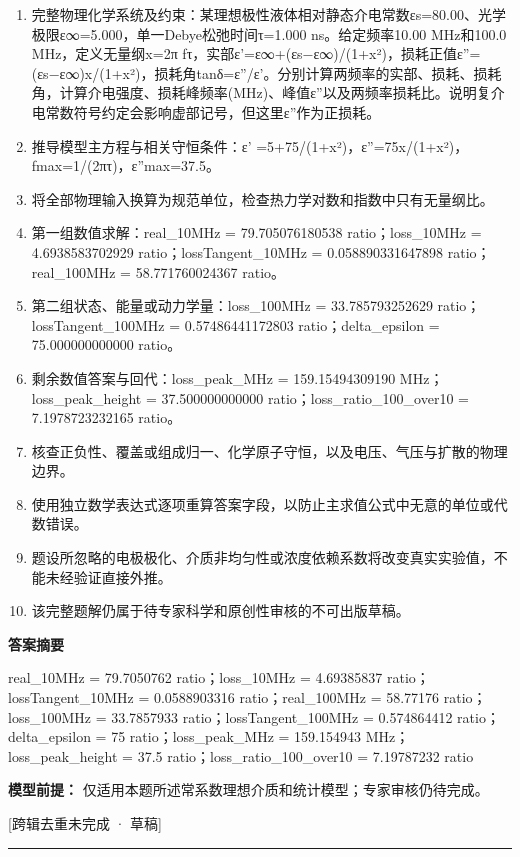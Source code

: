 \documentclass[UTF8,11pt,a4paper]{ctexart}
\begin{document}
\begin{enumerate}
\item 完整物理化学系统及约束：某理想极性液体相对静态介电常数εs=80.00、光学极限ε∞=5.000，单一Debye松弛时间τ=1.000 ns。给定频率10.00 MHz和100.0 MHz，定义无量纲x=2π fτ，实部ε'=ε∞+(εs−ε∞)/(1+x²)，损耗正值ε''=(εs−ε∞)x/(1+x²)，损耗角tanδ=ε''/ε'。分别计算两频率的实部、损耗、损耗角，计算介电强度、损耗峰频率(MHz)、峰值ε''以及两频率损耗比。说明复介电常数符号约定会影响虚部记号，但这里ε''作为正损耗。
\item 推导模型主方程与相关守恒条件：ε' =5+75/(1+x²)，ε''=75x/(1+x²)，fmax=1/(2πτ)，ε''max=37.5。
\item 将全部物理输入换算为规范单位，检查热力学对数和指数中只有无量纲比。
\item 第一组数值求解：real\_10MHz = 79.705076180538 ratio；loss\_10MHz = 4.6938583702929 ratio；lossTangent\_10MHz = 0.058890331647898 ratio；real\_100MHz = 58.771760024367 ratio。
\item 第二组状态、能量或动力学量：loss\_100MHz = 33.785793252629 ratio；lossTangent\_100MHz = 0.57486441172803 ratio；delta\_epsilon = 75.000000000000 ratio。
\item 剩余数值答案与回代：loss\_peak\_MHz = 159.15494309190 MHz；loss\_peak\_height = 37.500000000000 ratio；loss\_ratio\_100\_over10 = 7.1978723232165 ratio。
\item 核查正负性、覆盖或组成归一、化学原子守恒，以及电压、气压与扩散的物理边界。
\item 使用独立数学表达式逐项重算答案字段，以防止主求值公式中无意的单位或代数错误。
\item 题设所忽略的电极极化、介质非均匀性或浓度依赖系数将改变真实实验值，不能未经验证直接外推。
\item 该完整题解仍属于待专家科学和原创性审核的不可出版草稿。
\end{enumerate}
\noindent\textbf{答案摘要}\par
real\_10MHz = 79.7050762 ratio；loss\_10MHz = 4.69385837 ratio；lossTangent\_10MHz = 0.0588903316 ratio；real\_100MHz = 58.77176 ratio；loss\_100MHz = 33.7857933 ratio；lossTangent\_100MHz = 0.574864412 ratio；delta\_epsilon = 75 ratio；loss\_peak\_MHz = 159.154943 MHz；loss\_peak\_height = 37.5 ratio；loss\_ratio\_100\_over10 = 7.19787232 ratio\par
\noindent\textbf{模型前提：}
仅适用本题所述常系数理想介质和统计模型；专家审核仍待完成。\par
\noindent\textcolor{red!65!black}{[跨辑去重未完成 · 草稿]} \par
\medskip\hrule\medskip
{}
\end{document}
